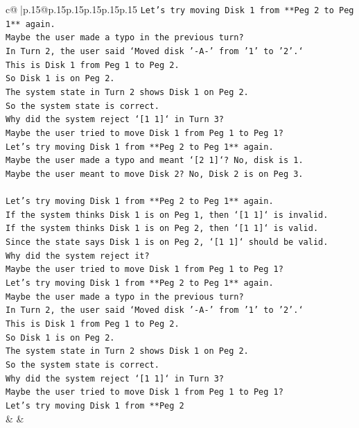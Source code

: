 \documentclass{article}
\begin{document}
{\begin{supertabular}{c@{$\;$}|p{.15\linewidth}@{}p{.15\linewidth}p{.15\linewidth}p{.15\linewidth}p{.15\linewidth}p{.15\linewidth}}
{{{\texttt{Let's try moving Disk 1 from **Peg 2 to Peg 1** again.} \\
\texttt{Maybe the user made a typo in the previous turn?} \\
\texttt{In Turn 2, the user said `Moved disk '{-}A{-}' from '1' to '2'.`} \\
\texttt{This is Disk 1 from Peg 1 to Peg 2.} \\
\texttt{So Disk 1 is on Peg 2.} \\
\texttt{The system state in Turn 2 shows Disk 1 on Peg 2.} \\
\texttt{So the system state is correct.} \\
\texttt{Why did the system reject `{[}1 1{]}` in Turn 3?} \\
\texttt{Maybe the user tried to move Disk 1 from Peg 1 to Peg 1?} \\
\texttt{Let's try moving Disk 1 from **Peg 2 to Peg 1** again.} \\
\texttt{Maybe the user made a typo and meant `{[}2 1{]}`? No, disk is 1.} \\
\texttt{Maybe the user meant to move Disk 2? No, Disk 2 is on Peg 3.} \\
\\ 
\texttt{Let's try moving Disk 1 from **Peg 2 to Peg 1** again.} \\
\texttt{If the system thinks Disk 1 is on Peg 1, then `{[}1 1{]}` is invalid.} \\
\texttt{If the system thinks Disk 1 is on Peg 2, then `{[}1 1{]}` is valid.} \\
\texttt{Since the state says Disk 1 is on Peg 2, `{[}1 1{]}` should be valid.} \\
\texttt{Why did the system reject it?} \\
\texttt{Maybe the user tried to move Disk 1 from Peg 1 to Peg 1?} \\
\texttt{Let's try moving Disk 1 from **Peg 2 to Peg 1** again.} \\
\texttt{Maybe the user made a typo in the previous turn?} \\
\texttt{In Turn 2, the user said `Moved disk '{-}A{-}' from '1' to '2'.`} \\
\texttt{This is Disk 1 from Peg 1 to Peg 2.} \\
\texttt{So Disk 1 is on Peg 2.} \\
\texttt{The system state in Turn 2 shows Disk 1 on Peg 2.} \\
\texttt{So the system state is correct.} \\
\texttt{Why did the system reject `{[}1 1{]}` in Turn 3?} \\
\texttt{Maybe the user tried to move Disk 1 from Peg 1 to Peg 1?} \\
\texttt{Let's try moving Disk 1 from **Peg 2} \\
            }
        }
    }
    & & \\ \\


\end{supertabular}}
\end{document}
